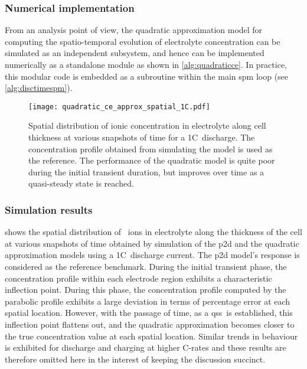 \subsubsection*{Numerical implementation}
From an analysis point of view,  the quadratic approximation model for computing
the  spatio-temporal evolution  of  electrolyte concentration  can be  simulated
as  an  independent subsystem,  and  hence  can  be implemented  numerically  as
a  standalone  module as  shown  in  \cref{alg:quadraticce}. In  practice,  this
modular code  is embedded as  a subroutine within  the main \gls{spm}  loop (see
\cref{alg:disctimespm}).



\begin{figure}[!htb]
    \centering
    \texttt{[image: quadratic\_ce\_approx\_spatial\_1C.pdf]}
    \caption[Spatial distribution of electrolyte concentration for 1C~discharge]{Spatial distribution of ionic concentration in electrolyte along
        cell thickness at various snapshots of time for a 1C~discharge. The
        concentration profile obtained from simulating the 
        model is used as the reference. The performance of the quadratic model
        is quite poor during the initial transient duration, but improves over
    time as a quasi-steady state is reached.}
    \label{fig:spatialionicconc1C}
\end{figure}


\subsubsection*{Simulation results}\label{subsubsec:simresultsbaselinequad}

 shows  the spatial distribution of  ~ions
in electrolyte  along the  thickness of  the cell at  various snapshots  of time
obtained by simulation  of the \gls{p2d} and the  quadratic approximation models
using a  1C~discharge current. The  \gls{p2d} model's response is  considered as
the reference benchmark.  During the initial transient  phase, the concentration
profile within each electrode region exhibits a characteristic inflection point.
During this phase,  the concentration profile computed by  the parabolic profile
exhibits  a  large deviation  in  terms  of  percentage  error at  each  spatial
location. However, with the passage of time, as a \gls{qss}~is established, this
inflection point flattens out, and the quadratic approximation becomes closer to
the  true  concentration value  at  each  spatial  location. Similar  trends  in
behaviour is  exhibited for discharge and  charging at higher C-rates  and these
results are  therefore omitted here  in the  interest of keeping  the discussion
succinct.

